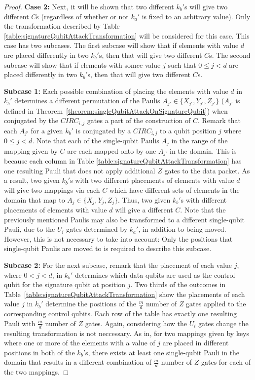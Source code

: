 \begin{proof}
\textbf{Case 2:} Next, it will be shown that two different $k_b'$s will give two different $C$s (regardless of whether or not $k_a'$ is fixed to an arbitrary value). Only the transformation described by Table \ref{table:signatureQubitAttackTransformation} will be considered for this case. This case has two subcases. The first subcase will show that if elements with value $d$ are placed differently in two $k_b'$s, then that will give two different $C$s. The second subcase will show that if elements with somce value $j$ such that $0 \leq j < d$ are placed differently in two $k_b'$s, then that will give two different $C$s.

\textbf{Subcase 1:} Each possible combination of placing the elements with value $d$ in $k_b'$ determines a different permutation of the Paulis $A_{j'} \in \{X_{j'}, Y_{j'}, Z_{j'}\}$ ($A_{j'}$ is defined in Theorem~\ref{theorem:singleQubitAttackOnSignatureQubit}) when conjugated by the $\mathit{CIRC}_{i,j}$ gates a part of the construction of $C$. Remark that each $A_{j'}$ for a given $k_b'$ is conjugated by a $\mathit{CIRC}_{i,j}$ to a qubit position $j$ where $0 \leq j < d$. Note that each of the single-qubit Paulis $A_j$ in the range of the mapping given by $C$ are each mapped onto by one $A_{j'}$ in the domain. This is because each column in Table \ref{table:signatureQubitAttackTransformation} has one resulting Pauli that does not apply additional $Z$ gates to the data packet. As a result, two given $k_b'$s with two different placements of elements with value $d$ will give two mappings via each $C$ which have different sets of elements in the domain that map to $A_{j} \in \{X_{j}, Y_{j}, Z_{j}\}$. Thus, two given $k_b'$s with different placements of elements with value $d$ will give a different $C$. Note that the previously mentioned Paulis may also be transformed to a different single-qubit Pauli, due to the $U_i$ gates determined by $k_a'$, in addition to being moved. However, this is not necessary to take into account: Only the positions that single-qubit Paulis are moved to is required to describe this subcase. 

\textbf{Subcase 2:} For the next subcase, remark that the placement of each value $j$, where  $0 < j < d$, in $k_b'$ determines which data qubits are used as the control qubit for the signature qubit at position $j$. Two thirds of the outcomes in Table~\ref{table:signatureQubitAttackTransformation} show the placements of each value $j$ in $k_b'$ determine the positions of the $\frac{m}{d}$ number of $Z$ gates applied to the corresponding control qubits. Each row of the table has exactly one resulting Pauli with $\frac{m}{d}$ number of $Z$ gates. Again, considering how the $U_i$ gates change the resulting transformation is not neccessary. As in, for two mappings given by keys where one or more of the elements with a value of $j$ are placed in different positions in both of the $k_b'$s, there exists at least one single-qubit Pauli in the domain that results in a different combination of $\frac{m}{d}$ number of $Z$ gates for each of the two mappings.


\end{proof}
